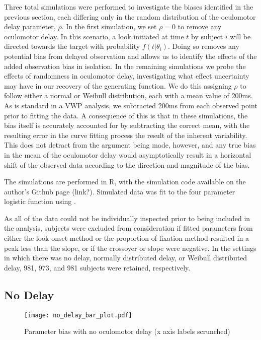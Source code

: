 Three total simulations were performed to investigate the biases identified in the previous section, each differing only in the random distribution of the oculomotor delay parameter, $\rho$. In the first simulation, we set $\rho = 0$ to remove any oculomotor delay. In this scenario, a look initiated at time $t$ by subject $i$ will be directed towards the target with probability $f(t|\theta_i)$. Doing so removes any potential bias from delayed observation and allows us to identify the effects of the added observation bias in isolation. In the remaining simulations we probe the effects of randomness in oculomotor delay, investigating what effect uncertainty may have in our recovery of the generating function. We do this assigning $\rho$ to follow either a normal or Weibull distribution, each with a mean value of 200ms. As is standard in a VWP analysis, we subtracted 200ms from each observed point prior to fitting the data. A consequence of this is that in these simulations, the bias itself is accurately accounted for by subtracting the correct mean, with the resulting error in the curve fitting process the result of the inherent variability. This does not detract from the argument being made, however, and any true bias in the mean of the oculomotor delay would asymptotically result in a horizontal shift of the observed data according to the direction and magnitude of the bias.

The simulations are performed in R, with the simulation code available on the author's Github page (link?). Simulated data was fit to the four parameter logistic function using .

As all of the data could not be individually inspected prior to being included in the analysis, subjects were excluded from consideration if fitted parameters from either the look onset method or the proportion of fixation method resulted in a peak less than the slope, or if the crossover or slope were negative. In the settings in which there was no delay, normally distributed delay, or Weibull distributed delay, 981, 973, and 981 subjects were retained, respectively.



\subsection{No Delay}


\begin{figure}[H]
\centering
\texttt{[image: no\_delay\_bar\_plot.pdf]}
\caption{Parameter bias with no oculomotor delay (x axis labels scrunched)}
\label{fig:par_bias_no_delay}
\end{figure}






